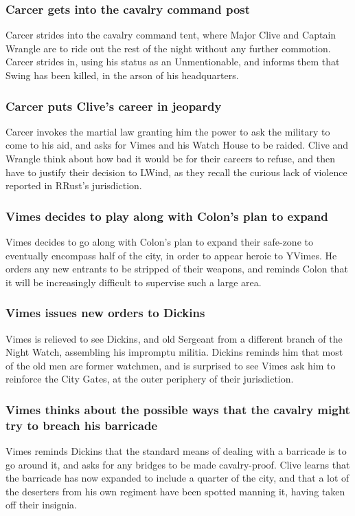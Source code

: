 \subsubsection{\Gls{Carcer} gets into the cavalry command post}
\Gls{Carcer} strides into the cavalry command tent, where Major \Gls{Clive} and Captain
\Gls{Wrangle} are to ride out the rest of the night without any further commotion. \Gls{Carcer}
strides in, using his status as an Unmentionable, and informs them that \Gls{Swing} has been killed,
in the arson of his headquarters.

\subsubsection{\Gls{Carcer} puts \Gls{Clive}'s career in jeopardy}
\Gls{Carcer} invokes the martial law granting him the power to ask the military to come to his aid,
and asks for \Gls{Vimes} and his Watch House to be raided. \Gls{Clive} and \Gls{Wrangle} think about
how bad it would be for their careers to refuse, and then have to justify their decision to
\Gls{LWind}, as they recall the curious lack of violence reported in \Gls{RRust}'s jurisdiction.

\subsubsection{\Gls{Vimes} decides to play along with \Gls{Colon}'s plan to expand}
\Gls{Vimes} decides to go along with \Gls{Colon}'s plan to expand their safe-zone to eventually
encompass half of the city, in order to appear heroic to \Gls{YVimes}. He orders any new entrants to
be stripped of their weapons, and reminds \Gls{Colon} that it will be increasingly difficult to
supervise such a large area.

\subsubsection{\Gls{Vimes} issues new orders to \Gls{Dickins}}
\Gls{Vimes} is relieved to see \Gls{Dickins}, and old Sergeant from a different branch of the Night
Watch, assembling his impromptu militia. \Gls{Dickins} reminds him that most of the old men are
former watchmen, and is surprised to see \Gls{Vimes} ask him to reinforce the City Gates, at the
outer periphery of their jurisdiction.

\subsubsection{\Gls{Vimes} thinks about the possible ways that the cavalry might try to breach his
    barricade}
\Gls{Vimes} reminds \Gls{Dickins} that the standard means of dealing with a barricade is to go
around it, and asks for any bridges to be made cavalry-proof. \Gls{Clive} learns that the barricade
has now expanded to include a quarter of the city, and that a lot of the deserters from his own
regiment have been spotted manning it, having taken off their insignia.

